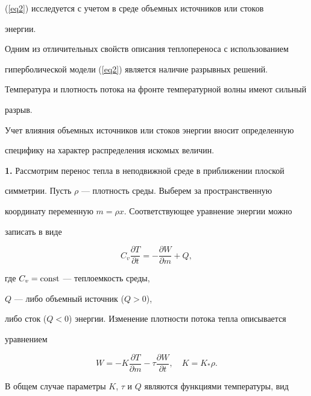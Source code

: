 (\ref{eq2}) исследуется с учетом в среде объемных источников или стоков


энергии.





Одним из отличительных свойств описания теплопереноса с использованием


гиперболической модели (\ref{eq2}) является наличие разрывных решений.


Температура и плотность потока на фронте температурной волны имеют сильный


разрыв.





Учет влияния объемных источников или стоков энергии вносит определенную


специфику на характер распределения искомых величин.


\medskip





{\bf 1.} Рассмотрим перенос тепла в неподвижной среде в приближении плоской


симметрии. Пусть $\rho$ --- плотность среды. Выберем за пространственную


координату переменную $m=\rho x$. Соответствующее уравнение энергии можно


записать в виде


\begin{equation}\label{eq3}


C_v\frac{\partial T}{\partial t}=-\frac{\partial W}{\partial m}+Q,


\end{equation}


где $C_v=\operatorname{const}$ --- теплоемкость среды,


$Q$ --- либо объемный источник ($Q>0$),


либо сток ($Q<0$) энергии. Изменение плотности потока тепла описывается


уравнением


\begin{equation}\label{eq4}


W=-K\frac{\partial T}{\partial m}-\tau\frac{\partial W}{\partial t},


\quad K=K_*\rho.


\end{equation}


В общем случае параметры $K$, $\tau$ и $Q$ являются функциями температуры, вид


